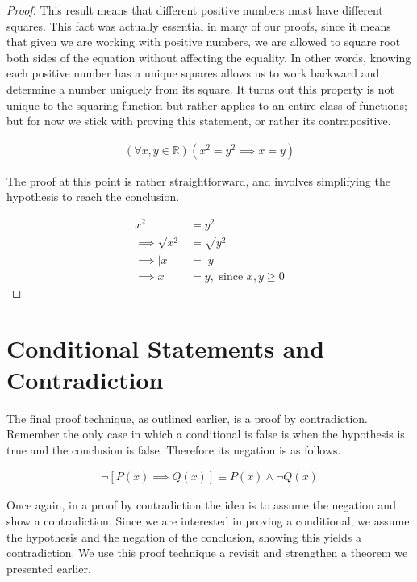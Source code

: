 \begin{proof}
	This result means that different positive numbers must have different squares. This fact was actually essential in many of our proofs, since it means that given we are working with positive numbers, we are allowed to square root both sides of the equation without affecting the equality. In other words, knowing each positive number has a unique squares allows us to work backward and determine a number uniquely from its square. It turns out this property is not unique to the squaring function but rather applies to an entire class of functions; but for now we stick with proving this statement, or rather its contrapositive.
	
	\begin{align*}
		(\forall x, y \in \mathbb{R})(x^2 = y^2 \implies x = y)
	\end{align*}
	
	The proof at this point is rather straightforward, and involves simplifying the hypothesis to reach the conclusion.
	
	\begin{align*}
		x^2 &= y^2 \\
		\implies \sqrt{x^2} &= \sqrt{y^2} \\
		\implies |x| &= |y| \\
		\implies x &= y, \text{ since $x, y \ge 0$}
	\end{align*}
\end{proof}
\vspace{\baselineskip}

\section{Conditional Statements and Contradiction}

The final proof technique, as outlined earlier, is a proof by contradiction. Remember the only case in which a conditional is false is when the hypothesis is true and the conclusion is false. Therefore its negation is as follows.

\begin{align*}
	\neg[P(x) \implies Q(x)] \equiv P(x) \wedge \neg Q(x)
\end{align*}

Once again, in a proof by contradiction the idea is to assume the negation and show a contradiction. Since we are interested in proving a conditional, we assume the hypothesis and the negation of the conclusion, showing this yields a contradiction. We use this proof technique a revisit and strengthen a theorem we presented earlier.

